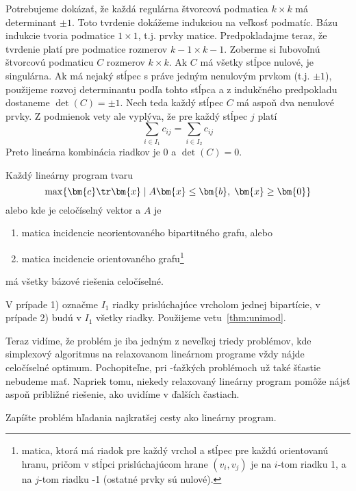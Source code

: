 \begin{dokaz}
  Potrebujeme dokázať, že každá regulárna štvorcová podmatica $k\times k$ má determinant $\pm1$. Toto tvrdenie
  dokážeme indukciou na veľkosť podmatíc. Bázu indukcie tvoria podmatice $1\times 1$, t.j. prvky matice.
  Predpokladajme teraz, že tvrdenie platí pre podmatice rozmerov $k-1\times k-1$. Zoberme si ľubovoľnú štvorcovú
  podmaticu $C$ rozmerov $k\times k$. Ak $C$ má všetky stĺpce nulové, je singulárna. Ak má nejaký stĺpec s práve jedným
  nenulovým prvkom (t.j. $\pm1$), použijeme rozvoj determinantu podľa tohto stĺpca a z indukčného predpokladu
  dostaneme $\det(C)=\pm1$. Nech teda každý stĺpec $C$ má aspoň dva nenulové prvky. Z podmienok vety ale vyplýva,
  že pre každý stĺpec $j$ platí 
  $$\sum\limits_{i\in I_1}c_{ij}=\sum\limits_{i\in I_2}c_{ij}$$
  Preto lineárna kombinácia riadkov je $0$ a $\det(C)=0$.
\end{dokaz}

\begin{dosl}
  Každý lineárny program tvaru $$\max\{\bm{c}\tr\bm{x}\mid A\bm{x}\le\bm{b},\;\bm{x}\ge\bm{0}\}$$ alebo
   kde  je celočíselný vektor a $A$ je
   \begin{enumerate}
     \item matica incidencie neorientovaného bipartitného grafu, alebo
     \item matica incidencie orientovaného grafu\footnote{matica, ktorá má riadok pre každý vrchol a stĺpec pre každú orientovanú hranu, pričom v stĺpci prislúchajúcom hrane $(v_i,v_j)$ je
       na $i$-tom riadku 1, a na $j$-tom riadku -1 (ostatné prvky sú nulové).}
   \end{enumerate}
   má všetky bázové riešenia celočíselné.
\end{dosl}
\begin{dokaz}
  V prípade 1) označme $I_1$ riadky prislúchajúce vrcholom jednej bipartície, 
  v prípade 2) budú v $I_1$ všetky riadky. Použijeme vetu~\ref{thm:unimod}.
\end{dokaz}

\noindent
Teraz vidíme, že problém \maxWBmatching je iba jedným z neveľkej triedy problémov, kde simplexový algoritmus na relaxovanom
lineárnom programe vždy nájde celočíselné optimum. Pochopiteľne, pri \NP-ťažkých problémoch už také šťastie 
nebudeme mať. Napriek tomu, niekedy relaxovaný lineárny program pomôže nájsť aspoň približné riešenie, ako
uvidíme v ďalších častiach.

\begin{prob}
  Zapíšte problém hľadania najkratšej cesty ako lineárny program.
\end{prob}

